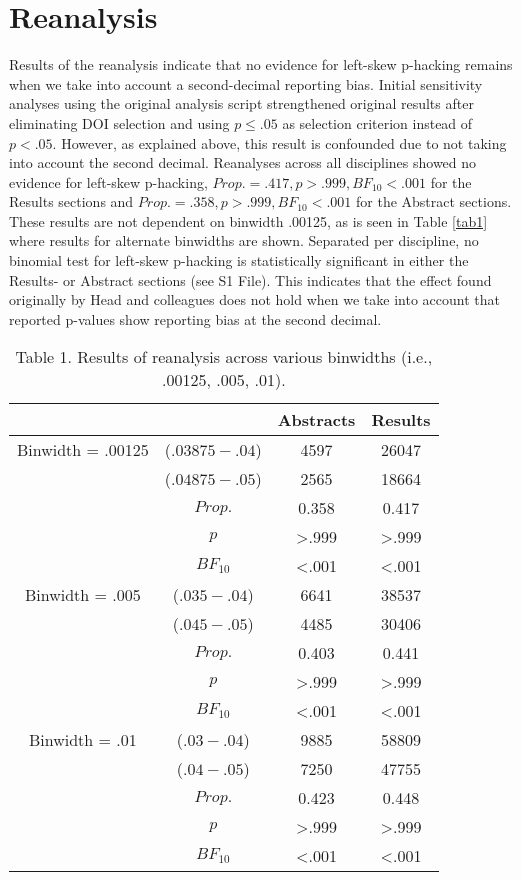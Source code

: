\section*{Reanalysis}
Results of the reanalysis indicate that no evidence for left-skew p-hacking remains when we take into account a second-decimal reporting bias. Initial sensitivity analyses using the original analysis script strengthened original results after eliminating DOI selection and using $p\leq.05$ as selection criterion instead of $p<.05$. However, as explained above, this result is confounded due to not taking into account the second decimal. Reanalyses across all disciplines showed no evidence for left-skew p-hacking, $Prop.=.417,p>.999, BF_{10}<.001$ for the Results sections and $Prop.=.358,p>.999,BF_{10}<.001$ for the Abstract sections. These results are not dependent on binwidth .00125, as is seen in Table \ref{tab1} where results for alternate binwidths are shown.  Separated per discipline, no binomial test for left-skew p-hacking is statistically significant in either the Results- or Abstract sections (see S1 File). This indicates that the effect found originally by Head and colleagues does not hold when we take into account that reported p-values show reporting bias at the second decimal.

\begin{table}[htbp]
    \begin{tabular}{cccc}
              &       & Abstracts & Results \\
              \hline
      Binwidth = .00125 & ($.03875-.04$) & 4597  & 26047 \\
          & ($.04875-.05$) & 2565  & 18664 \\
          & $Prop.$ & 0.358 & 0.417 \\
          & $p$     & >.999 & >.999 \\
          & $BF_{10}$  & <.001 & <.001 \\
    Binwidth = .005 & ($.035-.04$) & 6641  & 38537 \\
          & ($.045-.05$) & 4485  & 30406 \\
          & $Prop.$ & 0.403 & 0.441 \\
          & $p$     & >.999 & >.999 \\
          & $BF_{10}$  & <.001 & <.001 \\
    Binwidth = .01 & ($.03-.04$) & 9885  & 58809 \\
          & ($.04-.05$) & 7250  & 47755 \\
          & $Prop.$ & 0.423 & 0.448 \\
          & $p$     & >.999 & >.999 \\
          & $BF_{10}$  & <.001 & <.001 \\

    \end{tabular}
    \caption{Table 1. Results of reanalysis across various binwidths (i.e., .00125, .005, .01).} 
\end{table}